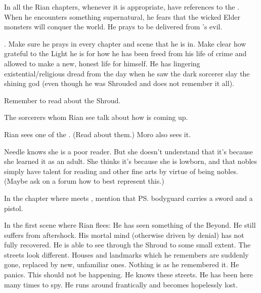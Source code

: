 \begin{changes}
    In all the Rian chapters, whenever it is appropriate, have references to the . 
    When he encounters something supernatural, he fears that the wicked Elder monsters will conquer the world. 
    He prays to be delivered from \Isphet's evil. 
    
    .
    Make sure he prays in every chapter and scene that he is in.
    Make clear how grateful to the Light he is for how he has been freed from his life of crime and allowed to make a new, honest life for himself.
    He has lingering existential/religious dread from the day when he saw the dark sorcerer slay the shining god (even though he was Shrouded and does not remember it all). 
  
  \begin{comment}
  \paragraph{The Thirsty Nether}
  \end{comment}
    Remember to read about the Shroud. 
  
    The sorcerers whom Rian see talk about how  is coming up. 
    
    Rian sees one of the . 
    (Read about them.) 
    Moro also sees it. 
    
    Needle knows she is a poor reader. 
    But she doesn't understand that it's because she learned it as an adult. 
    She thinks it's because she is lowborn, and that nobles simply have talent for reading and other fine arts by virtue of being nobles. 
    (Maybe ask on a forum how to best represent this.)
    
    In the chapter where \Tiroco meets \Uswa, mention that \ps{\Tiroco} bodyguard carries a sword and a pistol. 
    
    In the first scene where Rian flees: 
    He has seen something of the Beyond. 
    He still suffers from aftershock. 
    His mortal mind (otherwise driven by denial) has not fully recovered. 
    He is able to see through the Shroud to some small extent. 
    The streets look different.
    Houses and landmarks which he remembers are suddenly gone, replaced by new, unfamiliar ones. 
    Nothing is as he remembered it.
    He panics. 
    This should not be happening.
    He knows these streets. 
    He has been here many times to spy. 
    He runs around frantically and becomes hopelessly lost. 
    

\end{changes}
